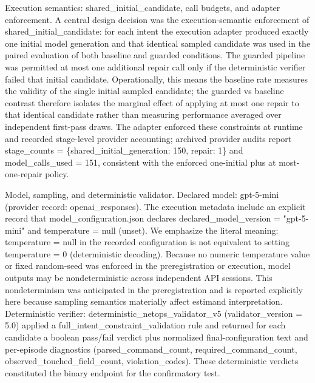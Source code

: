 \documentclass[conference]{IEEEtran}
\begin{document}
Execution semantics: shared\_initial\_candidate, call budgets, and adapter enforcement. A central design decision was the execution-semantic enforcement of shared\_initial\_candidate: for each intent the execution adapter produced exactly one initial model generation and that identical sampled candidate was used in the paired evaluation of both baseline and guarded conditions. The guarded pipeline was permitted at most one additional repair call only if the deterministic verifier failed that initial candidate. Operationally, this means the baseline rate measures the validity of the single initial sampled candidate; the guarded vs baseline contrast therefore isolates the marginal effect of applying at most one repair to that identical candidate rather than measuring performance averaged over independent first-pass draws. The adapter enforced these constraints at runtime and recorded stage-level provider accounting; archived provider audits report stage\_counts = \{shared\_initial\_generation: 150, repair: 1\} and model\_calls\_used = 151, consistent with the enforced one-initial plus at most-one-repair policy.

Model, sampling, and deterministic validator. Declared model: gpt-5-mini (provider record: openai\_responses). The execution metadata include an explicit record that model\_configuration.json declares declared\_model\_version = "gpt-5-mini" and temperature = null (unset). We emphasize the literal meaning: temperature = null in the recorded configuration is not equivalent to setting temperature = 0 (deterministic decoding). Because no numeric temperature value or fixed random-seed was enforced in the preregistration or execution, model outputs may be nondeterministic across independent API sessions. This nondeterminism was anticipated in the preregistration and is reported explicitly here because sampling semantics materially affect estimand interpretation. Deterministic verifier: deterministic\_netops\_validator\_v5 (validator\_version = 5.0) applied a full\_intent\_constraint\_validation rule and returned for each candidate a boolean pass/fail verdict plus normalized final-configuration text and per-episode diagnostics (parsed\_command\_count, required\_command\_count, observed\_touched\_field\_count, violation\_codes). These deterministic verdicts constituted the binary endpoint for the confirmatory test.
\end{document}
